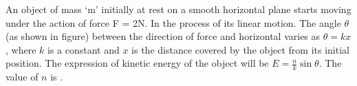 \item An object of mass ‘m’ initially at rest on a smooth horizontal plane starts moving under the action of force F = 2N. In the process of its linear motion. The angle $\theta$ (as shown in figure) between the direction of force and horizontal varies as $\theta = kx$, where $k$ is a constant and $x$ is the distance covered by the object from its initial position. The expression of kinetic energy of the object will be $E = \frac{n}{k} \sin \theta$. The value of $n$ is \underline{\hspace{2.5cm}}.
    \begin{center}
    \end{center}
